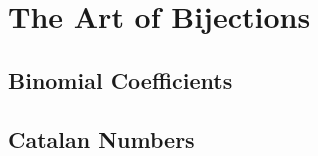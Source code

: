 \chapter{The Art of Bijections}



\section{Binomial Coefficients}



\section{Catalan Numbers}



\endinput